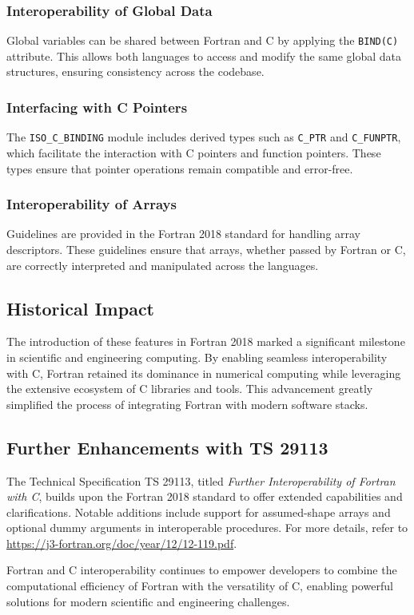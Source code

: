 \subsubsection{Interoperability of Global Data}
Global variables can be shared between Fortran and C by applying the \texttt{BIND(C)} attribute. This allows both languages to access and modify the same global data structures, ensuring consistency across the codebase.

\subsubsection{Interfacing with C Pointers}
The \texttt{ISO\_C\_BINDING} module includes derived types such as \texttt{C\_PTR} and \texttt{C\_FUNPTR}, which facilitate the interaction with C pointers and function pointers. These types ensure that pointer operations remain compatible and error-free.

\subsubsection{Interoperability of Arrays}
Guidelines are provided in the Fortran 2018 standard for handling array descriptors. These guidelines ensure that arrays, whether passed by Fortran or C, are correctly interpreted and manipulated across the languages.

\subsection{Historical Impact}
The introduction of these features in Fortran 2018 marked a significant milestone in scientific and engineering computing. By enabling seamless interoperability with C, Fortran retained its dominance in numerical computing while leveraging the extensive ecosystem of C libraries and tools. This advancement greatly simplified the process of integrating Fortran with modern software stacks.

\subsection{Further Enhancements with TS 29113}
The Technical Specification TS 29113, titled \emph{Further Interoperability of Fortran with C}, builds upon the Fortran 2018 standard to offer extended capabilities and clarifications. Notable additions include support for assumed-shape arrays and optional dummy arguments in interoperable procedures. For more details, refer to \url{https://j3-fortran.org/doc/year/12/12-119.pdf}.

Fortran and C interoperability continues to empower developers to combine the computational efficiency of Fortran with the versatility of C, enabling powerful solutions for modern scientific and engineering challenges.

\endinput  %
